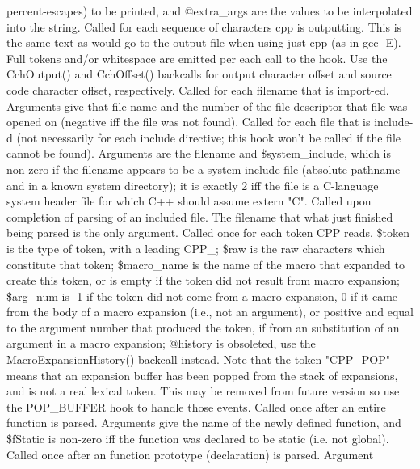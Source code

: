 percent-escapes) to be printed, and @extra\_\-args are the values to be 
interpolated into the string.
Called for each sequence of characters cpp is outputting.  This is the
same text as would go to the output file when using just cpp (as in gcc -E).
Full tokens and/or whitespace are emitted per each call to the hook.
Use the CchOutput() and CchOffset() backcalls for output character offset
and source code character offset, respectively.
Called for each filename that is \pphash{}import-ed.  Arguments give that
file name and the number of the file-descriptor that file was opened
on (negative iff the file was not found).
Called for each file that is \pphash{}include-d (not necessarily for each \pphash{}include
directive; this hook won't be called if the file cannot be found).
Arguments are the filename and \$system\_\-include, which is non-zero if the filename
appears to be a system include file (absolute pathname and in a known
system directory);  it is exactly 2 iff the file is a C-language
system header file for which C++ should assume extern "C".
Called upon completion of parsing of an included file.  The filename
that what just finished being parsed is the only argument.
Called once for each token CPP reads.  \$token is the type of token,
with a leading CPP\_\-; \$raw is the raw characters which constitute that
token; \$macro\_\-name is the name of the macro that expanded to create this token,
or is empty if the token did not result from macro expansion; \$arg\_\-num is -1
if the token did not come from a macro expansion, 0 if it came from the
body of a macro expansion (i.e., not an argument), or positive and equal
to the argument number that produced the token, if from an substitution
of an argument in a macro expansion; @history is obsoleted, use the
MacroExpansionHistory() backcall instead.  Note that the token "CPP\_\-POP"
means that an expansion buffer has been popped from the stack of expansions,
and is not a real lexical token.  This may be removed from future version
so use the POP\_\-BUFFER hook to handle those events.
Called once after an entire function is parsed.  Arguments
give the name of the newly defined function, and \$fStatic is non-zero
iff the function was declared to be static (i.e. not global).
Called once after an function prototype (declaration) is parsed.  Argument
